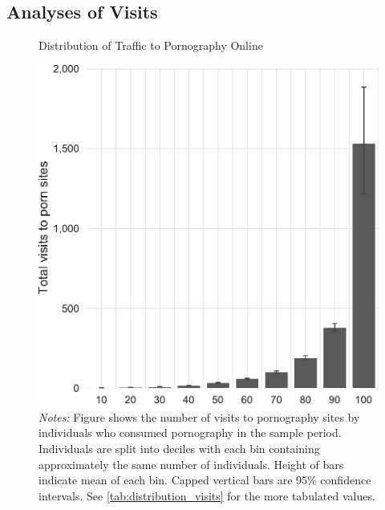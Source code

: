 \documentclass[12pt, letterpaper]{article}
\begin{document}
\subsection{Analyses of Visits}
\label{si:visits}
\begin{figure}[ht]
	\centering
	\caption{Distribution of Traffic to Pornography Online}
	\includegraphics[width=.5\linewidth]{../figs/distribution_visits_to_adultsites.pdf}
	\caption*{\footnotesize \emph{Notes:} 
		Figure shows the number of visits to pornography sites by individuals who consumed pornography in the sample period.
		Individuals are split into deciles with each bin containing approximately the same number of individuals.
		Height of bars indicate mean of each bin.
		Capped vertical bars are 95\% confidence intervals.
		See \cref{tab:distribution_visits} for the more tabulated values.
	}
	\label{fig:distribution_visits}
\end{figure}
\end{document}
